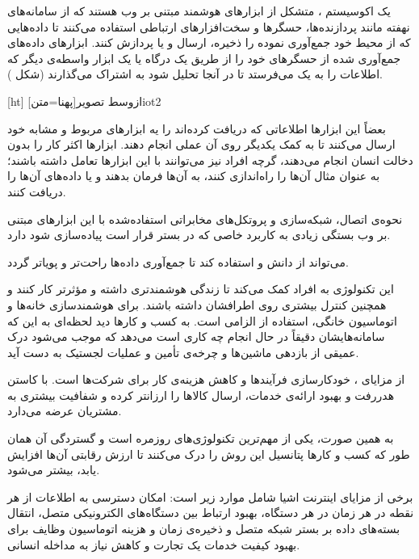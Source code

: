
یک اکوسیستم ، متشکل از ابزارهای هوشمند مبتنی بر وب هستند که از سامانه‌های نهفته مانند پردازنده‌ها، حسگرها و سخت‌افزارهای ارتباطی استفاده می‌کنند تا داده‌هایی که از محیط خود جمع‌آوری نموده را ذخیره، ارسال و یا پردازش کنند. ابزارهای  داده‌های جمع‌آوری شده از حسگرهای خود را از طریق یک درگاه  یا یک ابزار واسطه‌ی دیگر که اطلاعات را به یک  می‌فرستد تا در آنجا تحلیل شود به اشتراک می‌گذارند (شکل ).

[ht]
‌ازوسط
‌تصویر[پهنا=‌متن]{iot2}

بعضاً این ابزارها اطلاعاتی که دریافت کرده‌اند را یه ابزارهای مربوط و مشابه خود ارسال می‌کنند تا به کمک یکدیگر روی آن عملی انجام دهند. ابزارها اکثر کار را بدون دخالت انسان انجام می‌دهند، گرچه افراد نیز می‌توانند با این ابزارها تعامل داشته باشند؛ به عنوان مثال آن‌ها را راه‌اندازی کنند، به آن‌ها فرمان بدهند و یا داده‌های آن‌ها را دریافت کنند.

نحوه‌ی اتصال، شبکه‌سازی و پروتکل‌های مخابراتی استفاده‌شده با این ابزارهای مبتنی بر وب بستگی زیادی به کاربرد خاصی که در بستر  قرار است پیاده‌سازی شود دارد.

می‌تواند از دانش  و  استفاده کند تا جمع‌آوری داده‌ها راحت‌تر و پویاتر گردد.


این تکنولوژی به افراد کمک می‌کند تا زندگی هوشمندتری داشته و مؤثرتر کار کنند و همچنین کنترل بیشتری روی اطرافشان داشته باشند. برای هوشمندسازی خانه‌ها و اتوماسیون خانگی، استفاده از  الزامی است.  به کسب و کارها دید لحظه‌ای به این که سامانه‌هایشان دقیقاً در حال انجام چه کاری است می‌دهد که موجب می‌شود درک عمیقی از بازدهی ماشین‌ها و چرخه‌ی تأمین و عملیات لجستیک به دست آید.

از مزایای ، خودکارسازی فرآیندها و کاهش هزینه‌ی کار برای شرکت‌ها است. با کاستن هدررفت و بهبود ارائه‌ی خدمات، ارسال کالاها را ارزانتر کرده و شفافیت بیشتری به مشتریان عرضه می‌دارد.

به همین صورت،  یکی از مهم‌ترین تکنولوژی‌های روزمره است و گستردگی آن همان طور که کسب و کارها پتانسیل این روش را درک می‌کنند تا ارزش رقابتی آن‌ها افزایش یابد، بیشتر می‌شود.


برخی از مزایای اینترنت اشیا شامل موارد زیر است:
 امکان دسترسی به اطلاعات از هر نقطه در هر زمان در هر دستگاه،
 بهبود ارتباط بین دستگاه‌های الکترونیکی متصل،
 انتقال بسته‌های داده بر بستر شبکه متصل و ذخیره‌ی زمان و هزینه
 اتوماسیون وظایف برای بهبود کیفیت خدمات یک تجارت و کاهش نیاز به مداخله انسانی.

